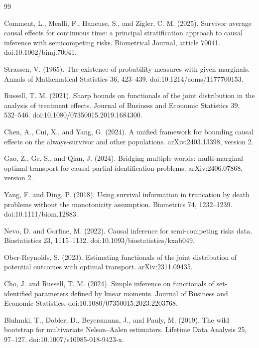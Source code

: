 \documentclass{article}
\begin{document}
\begin{thebibliography}{99}

   Comment, L., Mealli, F., Haneuse, S., and Zigler, C. M. (2025). Survivor average causal effects for continuous time: a principal stratification approach to causal inference with semicompeting risks. Biometrical Journal, article 70041. doi:10.1002/bimj.70041.

   Strassen, V. (1965). The existence of probability measures with given marginals. Annals of Mathematical Statistics 36, 423--439. doi:10.1214/aoms/1177700153.

   Russell, T. M. (2021). Sharp bounds on functionals of the joint distribution in the analysis of treatment effects. Journal of Business and Economic Statistics 39, 532--546. doi:10.1080/07350015.2019.1684300.

   Chen, A., Cui, X., and Yang, G. (2024). A unified framework for bounding causal effects on the always-survivor and other populations. arXiv:2403.13398, version 2.

   Gao, Z., Ge, S., and Qian, J. (2024). Bridging multiple worlds: multi-marginal optimal transport for causal partial-identification problems. arXiv:2406.07868, version 2.

   Yang, F. and Ding, P. (2018). Using survival information in truncation by death problems without the monotonicity assumption. Biometrics 74, 1232--1239. doi:10.1111/biom.12883.

   Nevo, D. and Gorfine, M. (2022). Causal inference for semi-competing risks data. Biostatistics 23, 1115--1132. doi:10.1093/biostatistics/kxab049.

   Ober-Reynolds, S. (2023). Estimating functionals of the joint distribution of potential outcomes with optimal transport. arXiv:2311.09435.

   Cho, J. and Russell, T. M. (2024). Simple inference on functionals of set-identified parameters defined by linear moments. Journal of Business and Economic Statistics. doi:10.1080/07350015.2023.2203768.

   Bluhmki, T., Dobler, D., Beyersmann, J., and Pauly, M. (2019). The wild bootstrap for multivariate Nelson--Aalen estimators. Lifetime Data Analysis 25, 97--127. doi:10.1007/s10985-018-9423-x.


\end{thebibliography}
\end{document}
